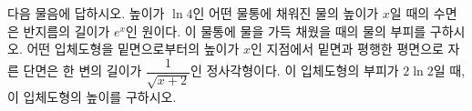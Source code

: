 다음 물음에 답하시오.
 높이가 $\ln 4$인 어떤 물통에 채워진 물의 높이가 $x$일 때의 수면은 반지름의 길이가 $e^x$인 원이다. 이 물통에 물을 가득 채웠을 때의 물의 부피를 구하시오.
 어떤 입체도형을 밑면으로부터의 높이가 $x$인 지점에서 밑면과 평행한 평면으로 자른 단면은 한 변의 길이가 $\dfrac{1}{\sqrt{x+2}}$인 정사각형이다. 이 입체도형의 부피가 $2\ln 2$일 때, 이 입체도형의 높이를 구하시오.
